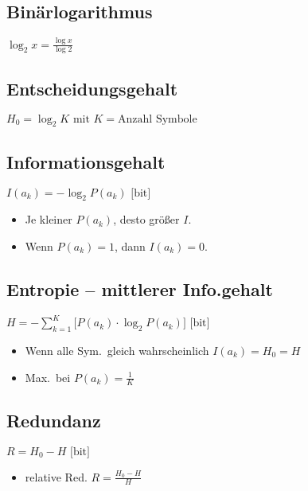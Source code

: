 \begin{multicols}{2}

\subsection*{Binärlogarithmus}
$\displaystyle \log_2{x} = \frac{\log{x}}{\log{2}}$

\subsection*{Entscheidungsgehalt}
$\displaystyle H_0 = \log_2{K} 
	\mbox{ mit } K = \text{Anzahl Symbole}$

\subsection*{Informationsgehalt}
\begin{minipage}{\columnwidth}
$\displaystyle I(a_k) = -\log_2{P(a_k)} \mbox{  [bit]}$
\begin{itemize}
	\setlength{\parskip}{0pt}
	\setlength{\itemsep}{0pt}
	\item Je kleiner $P(a_k)$, desto größer $I$.
	\item Wenn $P(a_k) = 1$, dann $I(a_k) = 0$.
\end{itemize}
\end{minipage}

\subsection*{Entropie -- mittlerer Info.gehalt}
\begin{minipage}{\columnwidth}
$\displaystyle H = - \sum_{k=1}^{K} 
	\bigg[ P(a_k) \cdot \log_2{P(a_k)} \bigg] 
	\mbox{  [bit]}$
\begin{itemize}
	\setlength{\parskip}{0pt}
	\setlength{\itemsep}{0pt plus 1pt}
	\item Wenn alle Sym.\ gleich wahrscheinlich $I(a_k) = H_0 = H$
	\item Max.\ bei $P(a_k) = \frac{1}{K}$
\end{itemize}
\end{minipage}

\subsection*{Redundanz}
\begin{minipage}{\columnwidth}
$\displaystyle R = H_0 - H \mbox{  [bit]}$
\begin{itemize}
	\setlength{\parskip}{0pt}
	\setlength{\itemsep}{0pt plus 1pt}
	\item relative Red. $\displaystyle R = \frac{H_0 - H}{H}$
\end{itemize}
\end{minipage}


\end{multicols}
